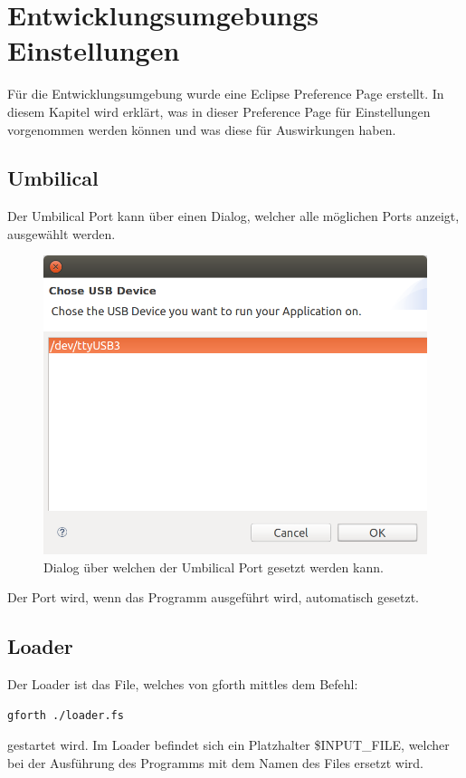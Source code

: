 \chapter{Entwicklungsumgebungs Einstellungen}
\label{settingschapter}
Für die Entwicklungsumgebung wurde eine Eclipse Preference Page erstellt. In diesem Kapitel wird erklärt, was in dieser Preference Page für Einstellungen vorgenommen werden können und was diese für Auswirkungen haben.
\section{Umbilical}

Der Umbilical Port kann über einen Dialog, welcher alle möglichen Ports anzeigt, ausgewählt werden.

\begin{figure}[H]
	\centering
		\includegraphics[scale=0.3]{idesettings/umbilical.png}
		\caption{Dialog über welchen der Umbilical Port gesetzt werden kann.}
		\label{fig:extensionpoint}
\end{figure}

Der Port wird, wenn das Programm ausgeführt wird, automatisch gesetzt. 

\section{Loader}

Der Loader ist das File, welches von gforth mittles dem Befehl:
%
\begin{verbatim}
gforth ./loader.fs
\end{verbatim}
%
gestartet wird. Im Loader befindet sich ein Platzhalter \$INPUT\_FILE, welcher bei der Ausführung des Programms mit dem Namen des Files ersetzt wird.